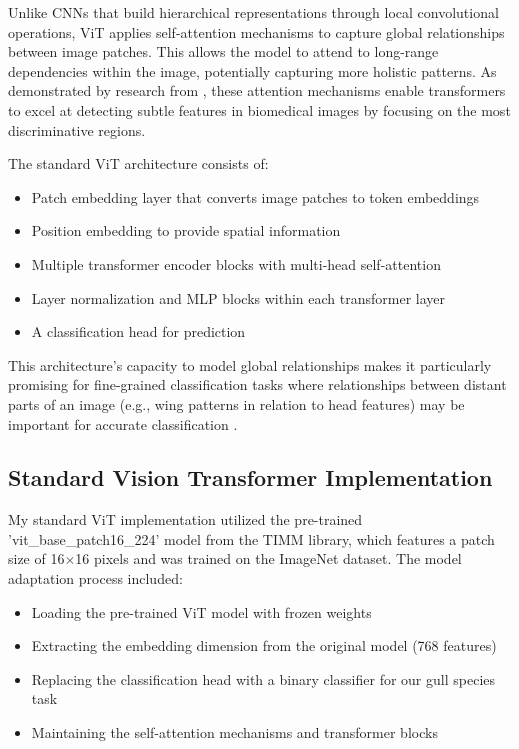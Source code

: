 \documentclass[a4paper,12pt]{article}
\begin{document}
Unlike CNNs that build hierarchical representations through local convolutional operations, ViT applies self-attention mechanisms to capture global relationships between image patches. This allows the model to attend to long-range dependencies within the image, potentially capturing more holistic patterns. As demonstrated by research from \citep{liu2022attention}, these attention mechanisms enable transformers to excel at detecting subtle features in biomedical images by focusing on the most discriminative regions.

The standard ViT architecture consists of:

\begin{itemize}
    \item Patch embedding layer that converts image patches to token embeddings
    \item Position embedding to provide spatial information
    \item Multiple transformer encoder blocks with multi-head self-attention
    \item Layer normalization and MLP blocks within each transformer layer
    \item A classification head for prediction
\end{itemize}

This architecture's capacity to model global relationships makes it particularly promising for fine-grained classification tasks where relationships between distant parts of an image (e.g., wing patterns in relation to head features) may be important for accurate classification \citep{conde2021exploring}.

\subsection{Standard Vision Transformer Implementation}

My standard ViT implementation utilized the pre-trained 'vit\_base\_patch16\_224' model from the TIMM library, which features a patch size of 16$\times$16 pixels and was trained on the ImageNet dataset. The model adaptation process included:

\begin{itemize}
    \item Loading the pre-trained ViT model with frozen weights
    \item Extracting the embedding dimension from the original model (768 features)
    \item Replacing the classification head with a binary classifier for our gull species task
    \item Maintaining the self-attention mechanisms and transformer blocks
\end{itemize}
\end{document}
